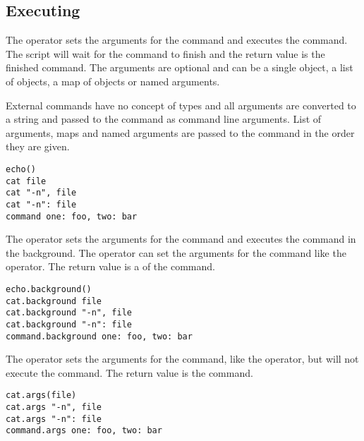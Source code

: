 \subsection{Executing} 

%

The  operator sets the arguments for the command and executes the
command. The script will wait for the command to finish and the return value 
is the finished command.
The arguments are optional and can be a single object, a list of objects,
a map of objects or named arguments. 

External commands have no concept of 
types and all arguments are converted
to a string and passed to the command as command line arguments.
List of arguments, maps and named arguments are passed to the command
in the order they are given.

\begin{lstlisting}[style=Groovybash, label={lst:example_call_op}]
echo()
cat file
cat "-n", file
cat "-n": file
command one: foo, two: bar
\end{lstlisting}

%

The  operator sets the arguments for the command and executes the
command in the background. 
The operator can set the arguments for the command like the 
operator. The return value is a \cite{future13} of the command.

\begin{lstlisting}[style=Groovybash, label={lst:example_call_op}]
echo.background()
cat.background file
cat.background "-n", file
cat.background "-n": file
command.background one: foo, two: bar
\end{lstlisting}


%

The  operator sets the arguments for the command, like 
the  operator, but will not execute the command. The return
value is the command.

\begin{lstlisting}[style=Groovybash, label={lst:example_args_op}]
cat.args(file)
cat.args "-n", file
cat.args "-n": file
command.args one: foo, two: bar
\end{lstlisting}

